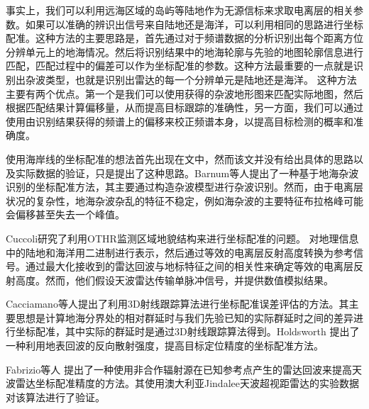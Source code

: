 事实上，我们可以利用远海区域的岛屿等陆地作为无源信标来求取电离层的相关参数。如果可以准确的辨识出信号来自陆地还是海洋，可以利用相同的思路进行坐标配准。这种方法的主要思路是，首先通过对于频谱数据的分析识别出每个距离方位分辨单元上的地海情况。然后将识别结果中的地海轮廓与先验的地图轮廓信息进行匹配，匹配过程中的偏差可以作为坐标配准的参数。这种方法最重要的一点就是识别出杂波类型，也就是识别出雷达的每一个分辨单元是陆地还是海洋。
这种方法主要有两个优点。第一个是我们可以使用获得的杂波地形图来匹配实际地图，然后根据匹配结果计算偏移量，从而提高目标跟踪的准确性，另一方面，我们可以通过使用由识别结果获得的频谱上的偏移来校正频谱本身，以提高目标检测的概率和准确度。

使用海岸线的坐标配准的想法首先出现在文\cite{wheadon1994ionospheric, anderson1995auto}中，然而该文并没有给出具体的思路以及实际数据的验证，只是提出了这种思路。Barnum等人提出了一种基于地海杂波识别的坐标配准方法，其主要通过构造杂波模型进行杂波识别。然而，由于电离层状况的复杂性，地海杂波杂乱的特征不稳定，例如海杂波的主要特征布拉格峰可能会偏移甚至失去一个峰值。

Cuccoli研究了利用OTHR监测区域地貌结构来进行坐标配准的问题。
对地理信息中的陆地和海洋用二进制进行表示，然后通过等效的电离层反射高度转换为参考信号。通过最大化接收到的雷达回波与地标特征之间的相关性来确定等效的电离层反射高度。然而，他们假设天波雷达传输单脉冲信号，并提供数值模拟结果。

Cacciamano等人提出了利用3D射线跟踪算法进行坐标配准误差评估的方法。其主要思想是计算地海分界处的相对群延时与我们先验已知的实际群延时之间的差异进行坐标配准，其中实际的群延时是通过3D射线跟踪算法得到。Holdsworth  提出了一种利用地表回波的反向散射强度，提高目标定位精度的坐标配准方法。

Fabrizio等人 提出了一种使用非合作辐射源在已知参考点产生的雷达回波来提高天波雷达坐标配准精度的方法。其使用澳大利亚Jindalee天波超视距雷达的实验数据对该算法进行了验证。
%

